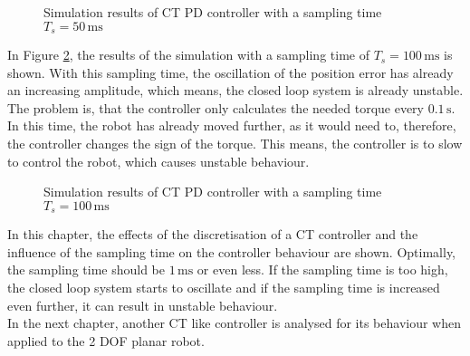 %	
\begin{figure}[H]
	\centering
	
	\caption{Simulation results of CT PD controller with a sampling time $T_s = 50\,\mathrm{ms}$}
	\label{fig:ch4_sim3}
\end{figure}
In Figure \ref{fig:ch4_sim5}, the results of the simulation with a sampling time of $T_s = 100\,\mathrm{ms}$ is shown. With this sampling time, the oscillation of the position error has already an increasing amplitude, which means, the closed loop system is already unstable. The problem is, that the controller only calculates the needed torque every $0.1\,\mathrm{s}$. In this time, the robot has already moved further, as it would need to, therefore, the controller changes the sign of the torque. This means, the controller is to slow to control the robot, which causes unstable behaviour.
%	
\begin{figure}[H]
	\centering
	
	\caption{Simulation results of CT PD controller with a sampling time $T_s = 100\,\mathrm{ms}$}
	\label{fig:ch4_sim5}
\end{figure}
In this chapter, the effects of the discretisation of a \ac{CT} controller and the influence of the sampling time on the controller behaviour are shown. Optimally, the sampling time should be $1\,\mathrm{ms}$ or even less. If the sampling time is too high, the closed loop system starts to oscillate and if the sampling time is increased even further, it can result in unstable behaviour.\\
In the next chapter, another \ac{CT} like controller is analysed for its behaviour when applied to the 2 \ac{DOF} planar robot.